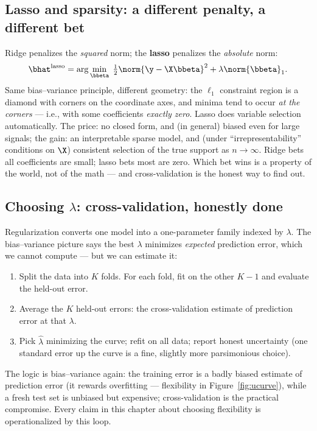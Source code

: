 \subsection{Lasso and sparsity: a different penalty, a different bet}

Ridge penalizes the \emph{squared} norm; the \textbf{lasso} penalizes the \emph{absolute} norm:
\begin{equation}\label{eq:lasso}
  \bhat^{\mathrm{lasso}} = \arg\min_{\bbeta} \; \tfrac{1}{2}\norm{\y - \X\bbeta}^2 + \lambda \norm{\bbeta}_1.
\end{equation}
Same bias--variance principle, different geometry: the $\ell_1$ constraint region is a diamond with corners on the coordinate axes, and minima tend to occur \emph{at the corners} — i.e., with some coefficients \emph{exactly zero}. Lasso does variable selection automatically. The price: no closed form, and (in general) biased even for large signals; the gain: an interpretable sparse model, and (under ``irrepresentability'' conditions on $\X$) consistent selection of the true support as $n \to \infty$. Ridge bets all coefficients are small; lasso bets most are zero. Which bet wins is a property of the world, not of the math — and cross-validation is the honest way to find out.

\subsection{Choosing $\lambda$: cross-validation, honestly done}

Regularization converts one model into a one-parameter family indexed by $\lambda$. The bias--variance picture says the best $\lambda$ minimizes \emph{expected} prediction error, which we cannot compute — but we can estimate it:

\begin{enumerate}[label=(\alph*)]
  \item Split the data into $K$ folds. For each fold, fit on the other $K-1$ and evaluate the held-out error.
  \item Average the $K$ held-out errors: the cross-validation estimate of prediction error at that $\lambda$.
  \item Pick $\hat{\lambda}$ minimizing the curve; refit on all data; report honest uncertainty (one standard error up the curve is a fine, slightly more parsimonious choice).
\end{enumerate}

The logic is bias--variance again: the training error is a badly biased estimate of prediction error (it rewards overfitting — flexibility in Figure~\ref{fig:ucurve}), while a fresh test set is unbiased but expensive; cross-validation is the practical compromise. Every claim in this chapter about choosing flexibility is operationalized by this loop.

